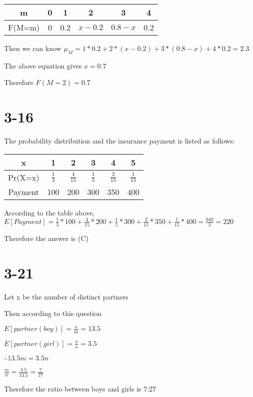 \documentclass[12pt]{article}
\begin{document}
\begin{spacing}{2.0}
\begin{tabular}{|c|c|c|c|c|c|}
  \hline
  m & 0 & 1 & 2 & 3 & 4 \\
  \hline
  F(M=m) & 0 & 0.2 & $x-0.2$ & $0.8-x$ & 0.2 \\
  \hline
\end{tabular}

Then we can know $\mu_M= 1*0.2+ 2*(x-0.2) +3*(0.8-x) +4*0.2=2.3 $

The above equation gives $x=0.7$

Therefore $F(M=2)=0.7$

\section*{3-16}
The probability distribution and the insurance payment is listed as follows:

\begin{tabular}{|c|c|c|c|c|c|}
  \hline
  x & 1 & 2 & 3 & 4 & 5 \\
  \hline
  Pr(X=x) & $\frac{1}{3}$ & $\frac{4}{15}$ & $\frac{1}{5}$ & $\frac{2}{15}$ & $\frac{1}{15}$ \\
  \hline
  Payment & 100 & 200 & 300 & 350 & 400 \\
  \hline
\end{tabular}

According to the table above, $E[Payment]=\frac{1}{3}*100 + \frac{4}{15}*200 + \frac{1}{5}*300+ \frac{2}{15}*350 + \frac{1}{15}*400= \frac{640}{3}=220$

Therefore the answer is (C)

\section*{3-21}
Let x be the number of distinct partners

Then according to this question

$E[partner(boy)]=\frac{x}{m}=13.5$

$E[partner(girl)]=\frac{x}{n}=3.5$

$\therefore 13.5m=3.5n$

$\frac{m}{n}=\frac{3.5}{13.5}=\frac{7}{27}$

Therefore the ratio between boys and girls is 7:27

\end{spacing}
\end{document}
